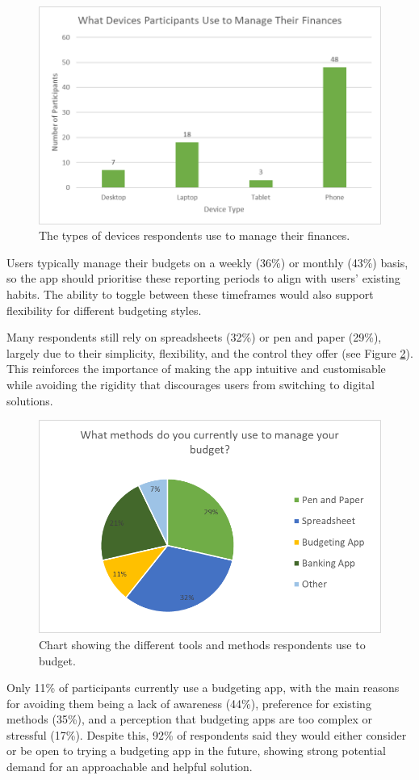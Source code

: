 \documentclass{l4proj}
\begin{document}
\begin{figure}[H]
    \centering
    \includegraphics[width=0.5\linewidth]{images/User-Survey/user-survey-charts-devices.png}
    \caption{The types of devices respondents use to manage their finances.}
    \label{fig:devices-main}
\end{figure}

Users typically manage their budgets on a weekly (36\%) or monthly (43\%) basis, so the app should prioritise these reporting periods to align with users’ existing habits. The ability to toggle between these timeframes would also support flexibility for different budgeting styles.

Many respondents still rely on spreadsheets (32\%) or pen and paper (29\%), largely due to their simplicity, flexibility, and the control they offer (see Figure \ref{fig:methods-main}). This reinforces the importance of making the app intuitive and customisable while avoiding the rigidity that discourages users from switching to digital solutions.

\begin{figure}[H]
    \centering
    \includegraphics[width=0.5\linewidth]{images/User-Survey/user-survey-charts-methods.png}
    \caption{Chart showing the different tools and methods respondents use to budget.}
    \label{fig:methods-main}
\end{figure}

Only 11\% of participants currently use a budgeting app, with the main reasons for avoiding them being a lack of awareness (44\%), preference for existing methods (35\%), and a perception that budgeting apps are too complex or stressful (17\%). Despite this, 92\% of respondents said they would either consider or be open to trying a budgeting app in the future, showing strong potential demand for an approachable and helpful solution.
\end{document}
